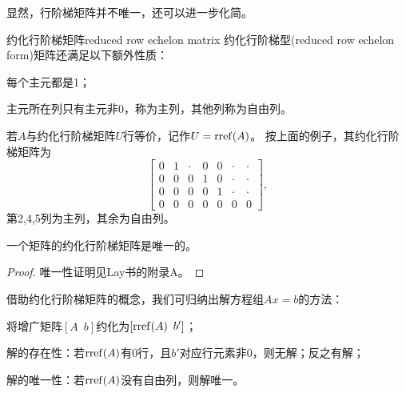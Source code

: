 显然，行阶梯矩阵并不唯一，还可以进一步化简。

\begin{definition}{约化行阶梯矩阵}{reduced row echelon matrix}
	约化行阶梯型(reduced row echelon form)矩阵还满足以下额外性质：
	\begin{compactitem}
		\item 每个主元都是1；
		\item 主元所在列只有主元非0，称为主列，其他列称为自由列。
	\end{compactitem}
	若$A$与约化行阶梯矩阵$U$行等价，记作$U=\operatorname{rref}(A)$。
	\tcblower
	按上面的例子，其约化行阶梯矩阵为
	\[
		\begin{bmatrix}
			0&1&\cdot&0&0&\cdot&\cdot\\
			0&0&0&1&0&\cdot&\cdot\\
			0&0&0&0&1&\cdot&\cdot\\
			0&0&0&0&0&0&0
		\end{bmatrix},
	\]
	第2,4,5列为主列，其余为自由列。
\end{definition}
\begin{theorem}
	{}{}
	一个矩阵的约化行阶梯矩阵是唯一的。
\end{theorem}

\begin{proof}
	唯一性证明见Lay书的附录A。
\end{proof}

\begin{remark}
	借助约化行阶梯矩阵的概念，我们可归纳出解方程组$Ax=b$的方法：
	\begin{compactitem}
		\item 将增广矩阵$[A\enspace b]$约化为$[\operatorname{rref}(A)\enspace b']$；
		\item 解的存在性：若$\operatorname{rref}(A)$有0行，且$b'$对应行元素非0，则无解；反之有解；
		\item 解的唯一性：若$\operatorname{rref}(A)$没有自由列，则解唯一。
	\end{compactitem}
\end{remark}

